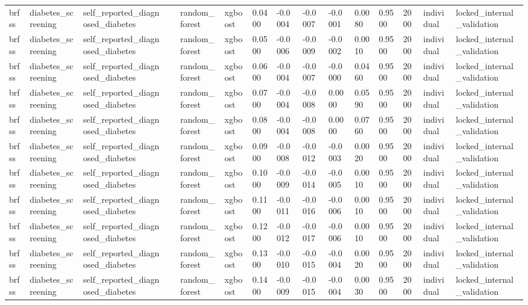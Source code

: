 \begin{tabular}{lllllllllllllll}
brfss & diabetes\_screening & self\_reported\_diagnosed\_diabetes &  & random\_forest & xgboost & 0.0400 & -0.0004 & -0.0007 & -0.0001 & 0.0080 & 0.9500 & 2000 & individual & locked\_internal\_validation \\
brfss & diabetes\_screening & self\_reported\_diagnosed\_diabetes &  & random\_forest & xgboost & 0.0500 & -0.0006 & -0.0009 & -0.0002 & 0.0010 & 0.9500 & 2000 & individual & locked\_internal\_validation \\
brfss & diabetes\_screening & self\_reported\_diagnosed\_diabetes &  & random\_forest & xgboost & 0.0600 & -0.0004 & -0.0007 & -0.0000 & 0.0460 & 0.9500 & 2000 & individual & locked\_internal\_validation \\
brfss & diabetes\_screening & self\_reported\_diagnosed\_diabetes &  & random\_forest & xgboost & 0.0700 & -0.0004 & -0.0008 & 0.0000 & 0.0590 & 0.9500 & 2000 & individual & locked\_internal\_validation \\
brfss & diabetes\_screening & self\_reported\_diagnosed\_diabetes &  & random\_forest & xgboost & 0.0800 & -0.0004 & -0.0008 & 0.0000 & 0.0760 & 0.9500 & 2000 & individual & locked\_internal\_validation \\
brfss & diabetes\_screening & self\_reported\_diagnosed\_diabetes &  & random\_forest & xgboost & 0.0900 & -0.0008 & -0.0012 & -0.0003 & 0.0020 & 0.9500 & 2000 & individual & locked\_internal\_validation \\
brfss & diabetes\_screening & self\_reported\_diagnosed\_diabetes &  & random\_forest & xgboost & 0.1000 & -0.0009 & -0.0014 & -0.0005 & 0.0010 & 0.9500 & 2000 & individual & locked\_internal\_validation \\
brfss & diabetes\_screening & self\_reported\_diagnosed\_diabetes &  & random\_forest & xgboost & 0.1100 & -0.0011 & -0.0016 & -0.0006 & 0.0010 & 0.9500 & 2000 & individual & locked\_internal\_validation \\
brfss & diabetes\_screening & self\_reported\_diagnosed\_diabetes &  & random\_forest & xgboost & 0.1200 & -0.0012 & -0.0017 & -0.0006 & 0.0010 & 0.9500 & 2000 & individual & locked\_internal\_validation \\
brfss & diabetes\_screening & self\_reported\_diagnosed\_diabetes &  & random\_forest & xgboost & 0.1300 & -0.0010 & -0.0015 & -0.0004 & 0.0020 & 0.9500 & 2000 & individual & locked\_internal\_validation \\
brfss & diabetes\_screening & self\_reported\_diagnosed\_diabetes &  & random\_forest & xgboost & 0.1400 & -0.0009 & -0.0015 & -0.0004 & 0.0030 & 0.9500 & 2000 & individual & locked\_internal\_validation \\

\end{tabular}
